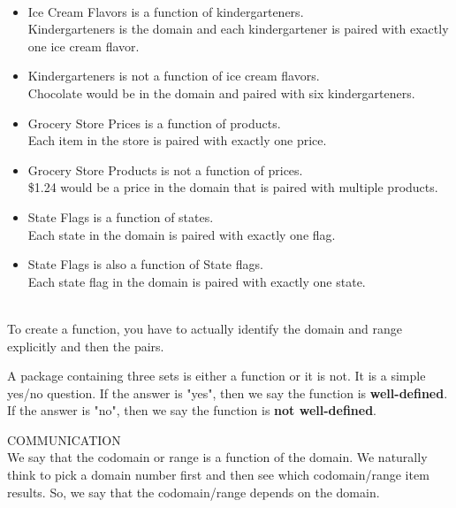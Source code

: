 \documentclass{ximera}
\begin{document}
\begin{example}
\quad \\
\begin{itemize}
\item Ice Cream Flavors is a function of kindergarteners. \\
Kindergarteners is the domain and each kindergartener is paired with exactly one ice cream flavor. 

\item Kindergarteners is not a function of ice cream flavors. \\
Chocolate would be in the domain and paired with six kindergarteners.

\item Grocery Store Prices is a function of products.\\
Each item in the store is paired with exactly one price. 

\item Grocery Store Products is not a function of prices.\\
\$1.24 would be a price in the domain that is paired with multiple products.

\item State Flags is a function of states.\\
Each state in the domain is paired with exactly one flag.

\item State Flags is also a function of State flags.\\
Each state flag in the domain is paired with exactly one state.
\end{itemize}

\end{example}
\quad \\



To create a function, you have to actually identify the domain and range explicitly and then the pairs.


\begin{definition}
A package containing three sets is either a function or it is not.  It is a simple yes/no question.  If the answer is "yes", then we say the function is \textbf{well-defined}.  If the answer is "no", then we say the function is \textbf{ not well-defined}.
\end{definition}


\begin{remark} COMMUNICATION \\
We say that the codomain or range is a function of the domain.
We naturally think to pick a domain number first and then see which codomain/range item results.  So, we say that the codomain/range depends on the domain.
\end{remark}
\quad \\
\end{document}
